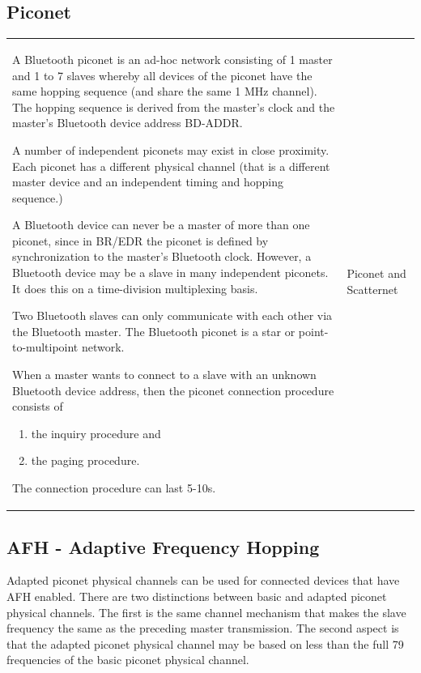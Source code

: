\subsection{Piconet}
	\begin{tabular}{ll}
		\parbox{14cm}{
			A Bluetooth piconet is an ad-hoc network consisting of 1 master and 1 to 7 slaves 
			whereby all devices of the piconet have the same hopping sequence (and share the 
			same 1 MHz channel). The hopping sequence is derived from the master’s clock  
			and the master's Bluetooth device address BD-ADDR. 

			A number of independent piconets may exist in close proximity. Each piconet has a 
			different physical channel (that is a different master device and an independent timing 
			and hopping sequence.) 
			
			A Bluetooth device can never be a master of more than one piconet, since in BR/EDR the piconet
			is defined by synchronization to the master's Bluetooth clock. However, a Bluetooth device 
			may be a slave in many independent piconets. It does this on a time-division multiplexing basis.
			
			Two Bluetooth slaves can only communicate with each other via the Bluetooth master. The Bluetooth
			piconet is a star or point-to-multipoint network.
			
			When a master wants to connect to a slave with an unknown Bluetooth device address, then the piconet 
			connection procedure consists of
			\begin{enumerate}
				\item the inquiry procedure and
				\item the paging procedure.
			\end{enumerate}
			
			The connection procedure can last 5-10s.
		}	
		& \parbox{4cm}{
			 \\ Piconet and Scatternet }
	\end{tabular}

\subsection{AFH - Adaptive Frequency Hopping}
	Adapted piconet physical channels can be used for connected devices that have AFH enabled. There are 
	two distinctions between basic and adapted piconet physical channels. The first is the same channel 
	mechanism that makes the slave frequency the same as the preceding master transmission. The second aspect 
	is that the adapted piconet physical channel may be based on less than the full 79 frequencies of the 
	basic piconet physical channel.
	
